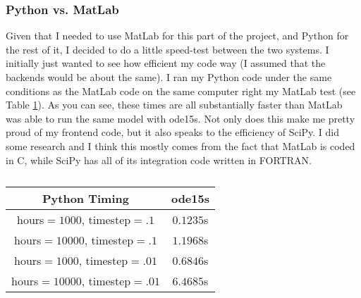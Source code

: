 \documentclass[]{article}
\begin{document}
		\subsubsection{Python vs. MatLab}
		Given that I needed to use MatLab for this part of the project, and Python for the rest of it, I decided to do a little speed-test between the two systems. I initially just wanted to see how efficient my code way (I assumed that the backends would be about the same). I ran my Python code under the same conditions as the MatLab code on the same computer right my MatLab test (see Table \ref{tab:pytiming}). As you can see, these times are all substantially faster than MatLab was able to run the same model with ode15s. Not only does this make me pretty proud of my frontend code, but it also speaks to the efficiency of SciPy. I did some research and I think this mostly comes from the fact that MatLab is coded in C, while SciPy has all of its integration code written in FORTRAN.

		\begin{table}[h]
			\centering
			\begin{tabular}{|c|c|}
				\hline
				Python Timing & ode15s \\ \hline
				hours$=1000$, timestep$=.1$ & $0.1235$s  \\ \hline
				hours$=10000$, timestep$=.1$ & $1.1968$s \\ \hline
				hours$=1000$, timestep$=.01$ & $0.6846$s \\ \hline
				hours$=10000$, timestep$=.01$ & $6.4685$s \\ \hline
			\end{tabular}
			\caption{}
			\label{tab:pytiming}
		\end{table}
\end{document}
